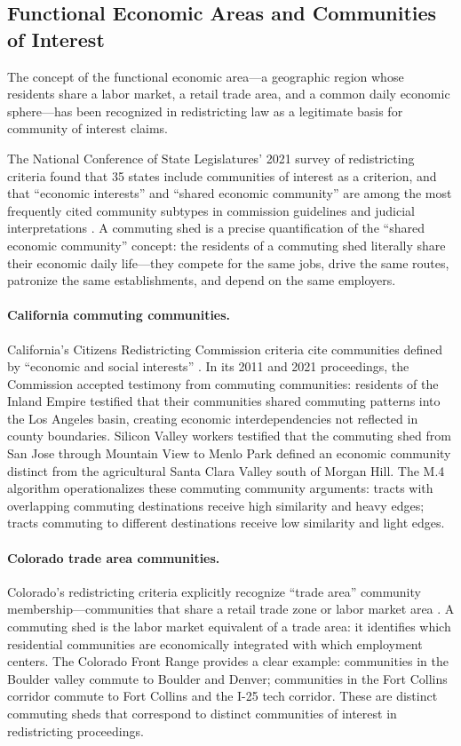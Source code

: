 \label{sec:legal}

\subsection{Functional Economic Areas and Communities of Interest}

The concept of the functional economic area---a geographic region whose
residents share a labor market, a retail trade area, and a common daily
economic sphere---has been recognized in redistricting law as a legitimate
basis for community of interest claims.

The National Conference of State Legislatures' 2021 survey of redistricting
criteria found that 35 states include communities of interest as a criterion,
and that ``economic interests'' and ``shared economic community'' are among
the most frequently cited community subtypes in commission guidelines and
judicial interpretations \citep{ncsl2021criteria}.
A commuting shed is a precise quantification of the ``shared economic
community'' concept: the residents of a commuting shed literally share
their economic daily life---they compete for the same jobs, drive the same
routes, patronize the same establishments, and depend on the same employers.

\paragraph{California commuting communities.}
California's Citizens Redistricting Commission criteria cite communities
defined by ``economic and social interests'' \citep{caprop11}.
In its 2011 and 2021 proceedings, the Commission accepted testimony from
commuting communities:
residents of the Inland Empire testified that their communities shared
commuting patterns into the Los Angeles basin, creating economic
interdependencies not reflected in county boundaries.
Silicon Valley workers testified that the commuting shed from San Jose
through Mountain View to Menlo Park defined an economic community distinct
from the agricultural Santa Clara Valley south of Morgan Hill.
The M.4 algorithm operationalizes these commuting community arguments:
tracts with overlapping commuting destinations receive high similarity
and heavy edges; tracts commuting to different destinations receive low
similarity and light edges.

\paragraph{Colorado trade area communities.}
Colorado's redistricting criteria explicitly recognize ``trade area'' community
membership---communities that share a retail trade zone or labor market area
\citep{coart5s44}.
A commuting shed is the labor market equivalent of a trade area: it identifies
which residential communities are economically integrated with which employment
centers.
The Colorado Front Range provides a clear example: communities in the Boulder
valley commute to Boulder and Denver; communities in the Fort Collins corridor
commute to Fort Collins and the I-25 tech corridor.
These are distinct commuting sheds that correspond to distinct communities
of interest in redistricting proceedings.

